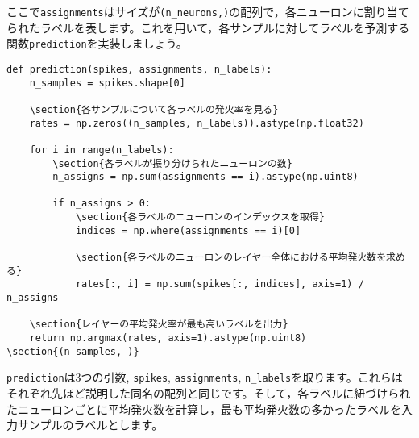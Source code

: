 ここで\texttt{assignments}はサイズが\texttt{(n\_neurons,)}の配列で，各ニューロンに割り当てられたラベルを表します。これを用いて，各サンプルに対してラベルを予測する関数\texttt{prediction}を実装しましょう。
\begin{verbatim}
def prediction(spikes, assignments, n_labels):    
    n_samples = spikes.shape[0]
    
    \section{各サンプルについて各ラベルの発火率を見る}
    rates = np.zeros((n_samples, n_labels)).astype(np.float32)
    
    for i in range(n_labels):
        \section{各ラベルが振り分けられたニューロンの数}
        n_assigns = np.sum(assignments == i).astype(np.uint8)
    
        if n_assigns > 0:
            \section{各ラベルのニューロンのインデックスを取得}
            indices = np.where(assignments == i)[0]
    
            \section{各ラベルのニューロンのレイヤー全体における平均発火数を求める}
            rates[:, i] = np.sum(spikes[:, indices], axis=1) / n_assigns
    
    \section{レイヤーの平均発火率が最も高いラベルを出力}
    return np.argmax(rates, axis=1).astype(np.uint8) \section{(n_samples, )}
\end{verbatim}
\texttt{prediction}は3つの引数, \texttt{spikes}, \texttt{assignments}, \texttt{n\_labels}を取ります。これらはそれぞれ先ほど説明した同名の配列と同じです。そして，各ラベルに紐づけられたニューロンごとに平均発火数を計算し，最も平均発火数の多かったラベルを入力サンプルのラベルとします。
